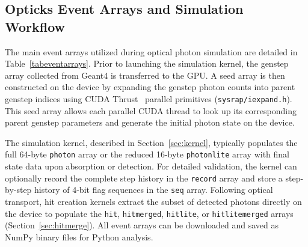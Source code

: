\documentclass{webofc}
\begin{document}
\subsection{Opticks Event Arrays and Simulation Workflow}
%
The main event arrays utilized during optical photon simulation are detailed in Table~\ref{tabeventarrays}. 
Prior to launching the simulation kernel, the genstep array collected from Geant4 is transferred to the GPU. 
A seed array is then constructed on the device by expanding the genstep photon counts into parent genstep indices 
using CUDA Thrust~\cite{thrust} parallel primitives (\texttt{sysrap/iexpand.h}). 
This seed array allows each parallel CUDA thread to look up its corresponding parent genstep parameters 
and generate the initial photon state on the device.

The simulation kernel, described in Section~\ref{sec:kernel}, typically populates the full 64-byte \texttt{photon} array 
or the reduced 16-byte \texttt{photonlite} array with final state data upon absorption or detection. 
For detailed validation, the kernel can optionally record the complete step history in the \texttt{record} array 
and store a step-by-step history of 4-bit flag sequences in the \texttt{seq} array.
%
Following optical transport, hit creation kernels extract the subset of detected photons directly on the device 
to populate the \texttt{hit}, \texttt{hitmerged}, \texttt{hitlite}, or \texttt{hitlitemerged} arrays (Section~\ref{sec:hitmerge}). 
All event arrays can be downloaded and saved as NumPy binary files for Python analysis.
%
\end{document}
